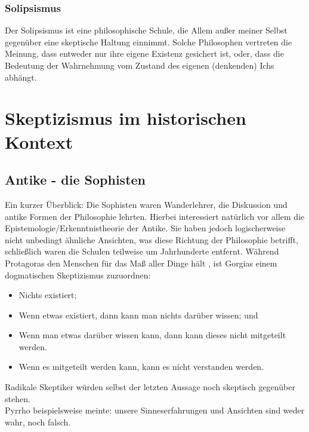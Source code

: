 \documentclass[12pt,a4paper]{article}
\begin{document}
		\subsubsection{Solipsismus}
Der Solipsismus ist eine philosophische Schule, die Allem außer meiner Selbst gegenüber eine skeptische Haltung einnimmt. Solche Philosophen vertreten die Meinung, dass entweder nur ihre eigene Existenz gesichert ist, oder, dass die Bedeutung der Wahrnehmung vom Zustand des eigenen (denkenden) Ichs abhängt.%
\section{Skeptizismus im historischen Kontext}
	\subsection{Antike - die Sophisten}
Ein kurzer Überblick: Die Sophisten waren Wanderlehrer, die Diskussion und antike Formen der Philosophie lehrten. Hierbei interessiert natürlich vor allem die Epistemologie/Erkenntnistheorie der Antike. Sie haben jedoch logischerweise nicht unbedingt ähnliche Ansichten, was diese Richtung der Philosophie betrifft, schließlich waren die Schulen teilweise um Jahrhunderte entfernt. Während Protagoras den Menschen für das Maß aller Dinge hält%
, ist Gorgias einem dogmatischen Skeptizismus zuzuordnen:
\begin{itemize}
\item Nichts existiert;
\item Wenn etwas existiert, dann kann man nichts darüber wissen; und
\item Wenn man etwas darüber wissen kann, dann kann dieses nicht mitgeteilt werden.
\item Wenn es mitgeteilt werden kann, kann es nicht verstanden werden.
\end{itemize}%
Radikale Skeptiker würden selbst der letzten Aussage noch skeptisch gegenüber stehen.\\
Pyrrho beispielsweise meinte: \glqq unsere Sinneserfahrungen und Ansichten sind weder wahr, noch falsch\grqq.%
\end{document}
